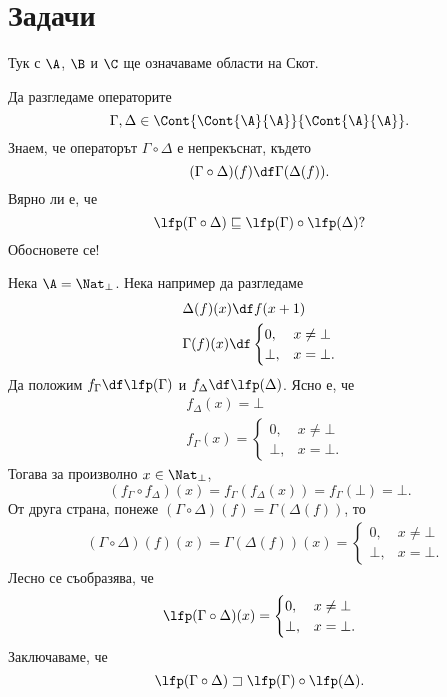 \section{Задачи}  

Тук с $\A$, $\B$ и $\C$ ще означаваме области на Скот.


\begin{problem}
  Да разгледаме операторите \[\Gamma,\Delta \in \Cont{\Cont{\A}{\A}}{\Cont{\A}{\A}}.\]
  Знаем, че операторът $\Gamma \circ \Delta$ е непрекъснат, където
  \[(\Gamma\circ\Delta)(f) \df \Gamma(\Delta(f)).\]
  Вярно ли е, че
  \[\lfp(\Gamma \circ \Delta) \sqsubseteq \lfp(\Gamma) \circ \lfp(\Delta)?\]
  Обосновете се!
\end{problem}
\ifhints
\begin{hint}
  Нека $\A = \Nat_\bot$.
  Нека например да разгледаме
  \begin{align*}
    & \Delta(f)(x) \df f(x+1)\\
    & \Gamma(f)(x) \df
      \begin{cases}
        0, & x \neq \bot\\
        \bot, & x = \bot.
      \end{cases}
  \end{align*}
  Да положим $f_\Gamma \df \lfp(\Gamma)$ и $f_\Delta \df \lfp(\Delta)$.
  Ясно е, че 
  \begin{align*}
    & f_\Delta(x) = \bot\\
    & f_\Gamma(x) =
    \begin{cases}
      0, & x \neq \bot\\
      \bot, & x = \bot.
    \end{cases}  
  \end{align*}
  Тогава за произволно $x \in \Nat_\bot$,
  \[(f_\Gamma\circ f_\Delta)(x) = f_\Gamma(f_\Delta(x)) = f_\Gamma(\bot)  = \bot.\]
  От друга страна, понеже $(\Gamma \circ \Delta)(f) = \Gamma(\Delta(f))$, то 
  \begin{align*}
    & (\Gamma \circ \Delta)(f)(x) = \Gamma(\Delta(f))(x) = 
      \begin{cases}
        0, & x \neq \bot\\
        \bot, & x = \bot.
      \end{cases}
  \end{align*}
  Лесно се съобразява, че 
  \[\lfp(\Gamma \circ \Delta)(x) =
  \begin{cases}
    0, & x \neq \bot\\
    \bot, & x = \bot.
  \end{cases}\]
  Заключаваме, че 
  \[\lfp(\Gamma \circ \Delta) \sqsupset \lfp(\Gamma) \circ \lfp(\Delta).\]
\end{hint}
\fi

